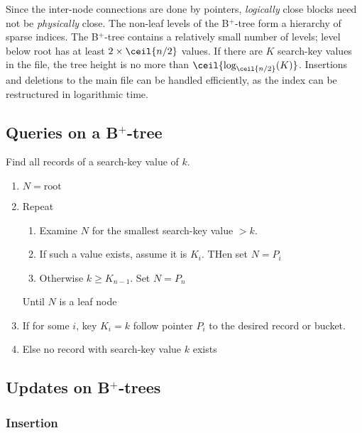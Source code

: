 \documentclass{article}
\begin{document}
Since the inter-node connections are done by pointers, \emph{logically} close blocks need not be \emph{physically} close. The non-leaf levels of the B$^{+}$-tree form a hierarchy of sparse indices. The B$^{+}$-tree contains a relatively small number of levels; level below root has at least $2 \times \ceil{n/2}$ values. If there are $K$ search-key values in the file, the tree height is no more than $\ceil{\textrm{log}_{\ceil{n/2}}(K)}$. Insertions and deletions to the main file can be handled efficiently, as the index can be restructured in logarithmic time. 

\subsection{Queries on a B$^{+}$-tree}

Find all records of a search-key value of $k$. 
\begin{enumerate}
  \item $N=\textrm{root}$ 
  \item Repeat 
    \begin{enumerate}
      \item Examine $N$ for the smallest search-key value $>k$. 
      \item If such a value exists, assume it is $K_i$. THen set $N=P_i$ 
      \item Otherwise $k \geq K_{n-1}$. Set $N=P_n$
    \end{enumerate}
    Until $N$ is a leaf node 
  \item If for some $i$, key $K_i = k$ follow pointer $P_i$ to the desired record or bucket. 
  \item Else no record with search-key value $k$ exists
\end{enumerate}

\subsection{Updates on B$^{+}$-trees}

\subsubsection{Insertion}
\end{document}
